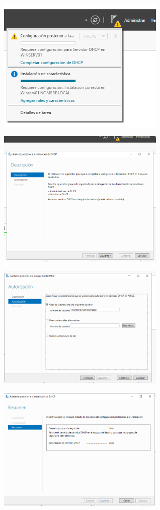 \documentclass[
  a4paper,
]{article}
\begin{document}
\includegraphics[width=0.6\textwidth,height=\textheight]{png/DHCP3.png}

\includegraphics[width=0.6\textwidth,height=\textheight]{png/DHCP4.png}

\includegraphics[width=0.6\textwidth,height=\textheight]{png/DHCP5.png}

\includegraphics[width=0.6\textwidth,height=\textheight]{png/DHCP6.png}
\end{document}
